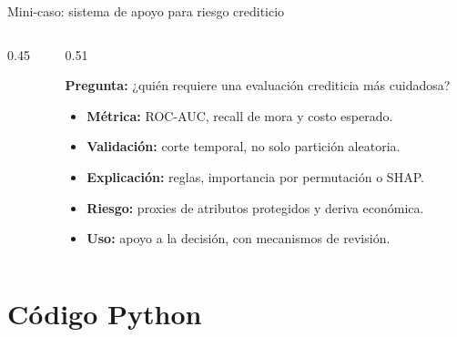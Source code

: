 \documentclass[aspectratio=169,11pt,table]{beamer}
\begin{document}
\begin{frame}{Mini-caso: sistema de apoyo para riesgo crediticio}
\footnotesize
\begin{columns}[T,onlytextwidth]
\begin{column}{0.45\textwidth}
\centering
\vspace{1.10cm}
\end{column}
\begin{column}{0.51\textwidth}
\begin{keybox}
\textbf{Pregunta:} ¿quién requiere una evaluación crediticia más cuidadosa?
\end{keybox}
\vspace{0.15cm}
\footnotesize
\begin{itemize}
  \item \textbf{Métrica:} ROC-AUC, recall de mora y costo esperado.
  \item \textbf{Validación:} corte temporal, no solo partición aleatoria.
  \item \textbf{Explicación:} reglas, importancia por permutación o SHAP.
  \item \textbf{Riesgo:} proxies de atributos protegidos y deriva económica.
  \item \textbf{Uso:} apoyo a la decisión, con mecanismos de revisión.
\end{itemize}
\end{column}
\end{columns}
\end{frame}

\section{Código Python}
\end{document}
